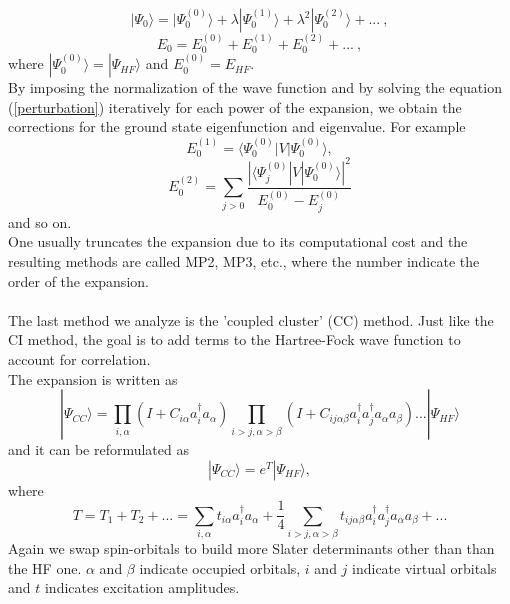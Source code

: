 \begin{equation}
    |\Psi_0\rangle = |\Psi_{0}^{(0)}\rangle + \lambda|\Psi_{0}^{(1)}\rangle + \lambda^2|\Psi_{0}^{(2)}\rangle + ... \ , \label{perturbation}
\end{equation}
\begin{equation}
    E_0 = E_0^{(0)} + E_0^{(1)} + E_0^{(2)} + ... \ ,
\end{equation}
where $|\Psi_{0}^{(0)}\rangle = |\Psi_{HF}\rangle $ and $E_0^{(0)} = E_{HF}$. \\
By imposing the normalization of the wave function and by solving the equation (\ref{perturbation}) iteratively for each power of the expansion, we obtain the corrections for the ground state eigenfunction and eigenvalue. For example
\begin{equation}
    E_0^{(1)} = \langle\Psi_{0}^{(0)}|V|\Psi_{0}^{(0)}\rangle,
\end{equation}
\begin{equation}
    E_0^{(2)} = \sum_{j>0} \frac{|\langle\Psi_j^{(0)}|V|\Psi_{0}^{(0)}\rangle|^2}{E_0^{(0)} - E_j^{(0)}}
\end{equation}
and so on. \\
One usually truncates the expansion due to its computational cost and the resulting methods are called MP2, MP3, etc., where the number indicate the order of the expansion. \\
\\
The last method we analyze is the 'coupled cluster' (CC) method. Just like the CI method, the goal is to add terms to the Hartree-Fock wave function to account for correlation. \\
The expansion is written as
\begin{equation}
    |\Psi_{CC}\rangle = \prod_{i,\alpha} (I + C_{i\alpha} a^\dagger_i a_\alpha)
                        \prod_{i>j,\alpha>\beta} (I + C_{ij\alpha\beta} a^\dagger_i a^\dagger_j a_\alpha a_\beta) ... |\Psi_{HF}\rangle
\end{equation}
and it can be reformulated as
\begin{equation}
    |\Psi_{CC}\rangle = e^T |\Psi_{HF}\rangle,
\end{equation}
where
\begin{equation}
    T = T_1 + T_2 + ... = \sum_{i,\alpha} t_{i\alpha} a^\dagger_i a_\alpha + \frac14 \sum_{i>j,\alpha>\beta} t_{ij\alpha\beta} a^\dagger_i a^\dagger_j a_\alpha a_\beta + ...
\end{equation}
Again we swap spin-orbitals to build more Slater determinants other than than the HF one. $\alpha$ and $\beta$ indicate occupied orbitals, $i$ and $j$ indicate virtual orbitals and $t$ indicates excitation amplitudes. \\
